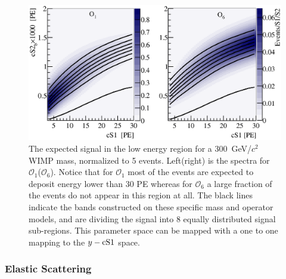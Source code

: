 \begin{figure}[h!]
\begin{minipage}{1.\linewidth}
\centerline{\includegraphics[width=1.\linewidth]{Figures/SigLowO1O6.eps}}
\end{minipage}
\caption{The expected signal in the low energy region for a 300~GeV/$c^2$ WIMP mass, normalized to 5 events. Left(right) is the spectra for $\mathcal{O}_1$($\mathcal{O}_6$). Notice that for $\mathcal{O}_1$ most of the events are expected to deposit energy lower than 30 PE whereas for $\mathcal{O}_6$ a large fraction of the events do not appear in this region at all. The black lines indicate the bands constructed on these specific mass and operator models, and are dividing the signal into 8 equally distributed signal sub-regions. This parameter space can be mapped with a one to one mapping to the $y-\mathrm{cS1}$ space.}
\label{fig:LowE}
\end{figure}




%

\subsubsection{Elastic Scattering}
\label{subsubsec:Elastic}

